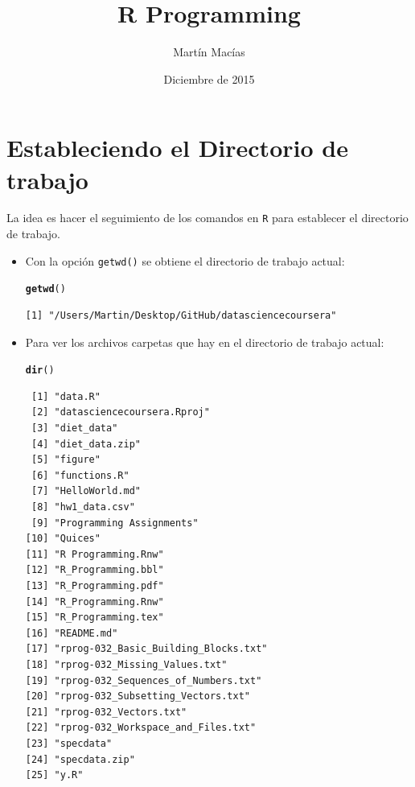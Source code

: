 \documentclass{article}\usepackage[]{graphicx}\usepackage[]{color}
\title{R Programming}
\author{Martín Macías}
\date{Diciembre de 2015}
\makeatletter
\newcommand{\hlstd}[1]{\textcolor[rgb]{0.345,0.345,0.345}{#1}}%
\newcommand{\hlkwd}[1]{\textcolor[rgb]{0.737,0.353,0.396}{\textbf{#1}}}%
\newenvironment{kframe}{%
 \def\at@end@of@kframe{}%
 \ifinner\ifhmode%
  \def\at@end@of@kframe{\end{minipage}}%
  \begin{minipage}{\columnwidth}%
 \fi\fi%
 \def\FrameCommand##1{\hskip\@totalleftmargin \hskip-\fboxsep
 \colorbox{shadecolor}{##1}\hskip-\fboxsep
     \hskip-\linewidth \hskip-\@totalleftmargin \hskip\columnwidth}%
 \MakeFramed {\advance\hsize-\width
   \@totalleftmargin\z@ \linewidth\hsize
   \@setminipage}}%
 {\par\unskip\endMakeFramed%
 \at@end@of@kframe}
\newenvironment{knitrout}{}{} %
\makeatother
\begin{document}
\maketitle

\section{Estableciendo el Directorio de trabajo}
La idea es hacer el seguimiento de los comandos en \texttt{R} para establecer el directorio de trabajo.\\
\begin{itemize}
  \item Con la opción \texttt{getwd()} se obtiene el directorio de trabajo actual:
\begin{knitrout}
\color{fgcolor}\begin{kframe}
\begin{alltt}
  \hlkwd{getwd}\hlstd{()}
\end{alltt}
\begin{verbatim}
[1] "/Users/Martin/Desktop/GitHub/datasciencecoursera"
\end{verbatim}
\end{kframe}
\end{knitrout}

  \item Para ver los archivos  carpetas que hay en el directorio de trabajo actual:
\begin{knitrout}
\color{fgcolor}\begin{kframe}
\begin{alltt}
  \hlkwd{dir}\hlstd{()}
\end{alltt}
\begin{verbatim}
 [1] "data.R"                             
 [2] "datasciencecoursera.Rproj"          
 [3] "diet_data"                          
 [4] "diet_data.zip"                      
 [5] "figure"                             
 [6] "functions.R"                        
 [7] "HelloWorld.md"                      
 [8] "hw1_data.csv"                       
 [9] "Programming Assignments"            
[10] "Quices"                             
[11] "R Programming.Rnw"                  
[12] "R_Programming.bbl"                  
[13] "R_Programming.pdf"                  
[14] "R_Programming.Rnw"                  
[15] "R_Programming.tex"                  
[16] "README.md"                          
[17] "rprog-032_Basic_Building_Blocks.txt"
[18] "rprog-032_Missing_Values.txt"       
[19] "rprog-032_Sequences_of_Numbers.txt" 
[20] "rprog-032_Subsetting_Vectors.txt"   
[21] "rprog-032_Vectors.txt"              
[22] "rprog-032_Workspace_and_Files.txt"  
[23] "specdata"                           
[24] "specdata.zip"                       
[25] "y.R"                                
\end{verbatim}
\end{kframe}
\end{knitrout}


\end{itemize}
\end{document}
